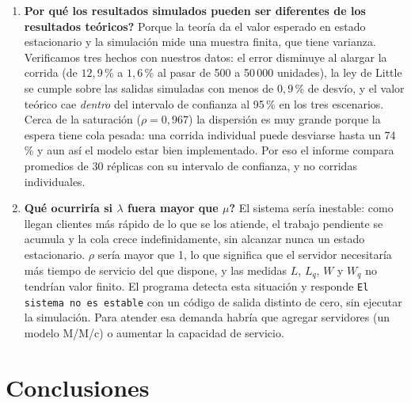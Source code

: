 \documentclass[11pt,a4paper]{article}
\begin{document}
\begin{enumerate}
    \item \textbf{\textquestiondown{}Por qué los resultados simulados pueden ser diferentes de los resultados teóricos?}
    Porque la teoría da el valor esperado en estado estacionario y la simulación mide una
    muestra finita, que tiene varianza. Verificamos tres hechos con nuestros datos: el
    error disminuye al alargar la corrida (de $12{,}9$\,\% a $1{,}6$\,\% al pasar de 500 a
    50\,000 unidades), la ley de Little se cumple sobre las salidas simuladas con menos de
    $0{,}9$\,\% de desvío, y el valor teórico cae \emph{dentro} del intervalo de confianza
    al 95\,\% en los tres escenarios. Cerca de la saturación ($\rho = 0{,}967$) la
    dispersión es muy grande porque la espera tiene cola pesada: una corrida individual
    puede desviarse hasta un 74\,\% y aun así el modelo estar bien implementado. Por eso el
    informe compara promedios de 30 réplicas con su intervalo de confianza, y no corridas
    individuales.

    \item \textbf{\textquestiondown{}Qué ocurriría si $\lambda$ fuera mayor que $\mu$?}
    El sistema sería inestable: como llegan clientes más rápido de lo que se los atiende,
    el trabajo pendiente se acumula y la cola crece indefinidamente, sin alcanzar nunca un
    estado estacionario. $\rho$ sería mayor que 1, lo que significa que el servidor
    necesitaría más tiempo de servicio del que dispone, y las medidas $L$, $L_q$, $W$ y
    $W_q$ no tendrían valor finito. El programa detecta esta situación y responde
    \texttt{El sistema no es estable} con un código de salida distinto de cero, sin
    ejecutar la simulación. Para atender esa demanda habría que agregar servidores
    (un modelo M/M/c) o aumentar la capacidad de servicio.
\end{enumerate}

\section{Conclusiones}
\end{document}

